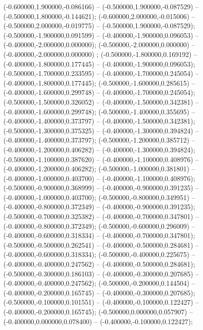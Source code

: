  (-0.600000,1.900000,-0.086166) -- (-0.500000,1.900000,-0.087529) -- (-0.500000,1.800000,-0.144621);
 (-0.600000,2.000000,-0.015006) -- (-0.500000,2.000000,-0.019775) -- (-0.500000,1.900000,-0.087529);
 (-0.500000,-1.900000,0.091599) -- (-0.400000,-1.900000,0.096053) -- (-0.400000,-2.000000,0.000000);
 (-0.500000,-2.000000,0.000000) -- (-0.400000,-2.000000,0.000000) ;
 (-0.500000,-1.800000,0.169192) -- (-0.400000,-1.800000,0.177445) -- (-0.400000,-1.900000,0.096053);
 (-0.500000,-1.700000,0.233595) -- (-0.400000,-1.700000,0.245054) -- (-0.400000,-1.800000,0.177445);
 (-0.500000,-1.600000,0.285615) -- (-0.400000,-1.600000,0.299748) -- (-0.400000,-1.700000,0.245054);
 (-0.500000,-1.500000,0.326052) -- (-0.400000,-1.500000,0.342381) -- (-0.400000,-1.600000,0.299748);
 (-0.500000,-1.400000,0.355695) -- (-0.400000,-1.400000,0.373797) -- (-0.400000,-1.500000,0.342381);
 (-0.500000,-1.300000,0.375325) -- (-0.400000,-1.300000,0.394824) -- (-0.400000,-1.400000,0.373797);
 (-0.500000,-1.200000,0.385712) -- (-0.400000,-1.200000,0.406282) -- (-0.400000,-1.300000,0.394824);
 (-0.500000,-1.100000,0.387620) -- (-0.400000,-1.100000,0.408976) -- (-0.400000,-1.200000,0.406282);
 (-0.500000,-1.000000,0.381801) -- (-0.400000,-1.000000,0.403700) -- (-0.400000,-1.100000,0.408976);
 (-0.500000,-0.900000,0.368999) -- (-0.400000,-0.900000,0.391235) -- (-0.400000,-1.000000,0.403700);
 (-0.500000,-0.800000,0.349951) -- (-0.400000,-0.800000,0.372349) -- (-0.400000,-0.900000,0.391235);
 (-0.500000,-0.700000,0.325382) -- (-0.400000,-0.700000,0.347801) -- (-0.400000,-0.800000,0.372349);
 (-0.500000,-0.600000,0.296009) -- (-0.400000,-0.600000,0.318334) -- (-0.400000,-0.700000,0.347801);
 (-0.500000,-0.500000,0.262541) -- (-0.400000,-0.500000,0.284681) -- (-0.400000,-0.600000,0.318334);
 (-0.500000,-0.400000,0.225675) -- (-0.400000,-0.400000,0.247562) -- (-0.400000,-0.500000,0.284681);
 (-0.500000,-0.300000,0.186103) -- (-0.400000,-0.300000,0.207685) -- (-0.400000,-0.400000,0.247562);
 (-0.500000,-0.200000,0.144504) -- (-0.400000,-0.200000,0.165745) -- (-0.400000,-0.300000,0.207685);
 (-0.500000,-0.100000,0.101551) -- (-0.400000,-0.100000,0.122427) -- (-0.400000,-0.200000,0.165745);
 (-0.500000,0.000000,0.057907) -- (-0.400000,0.000000,0.078400) -- (-0.400000,-0.100000,0.122427);
